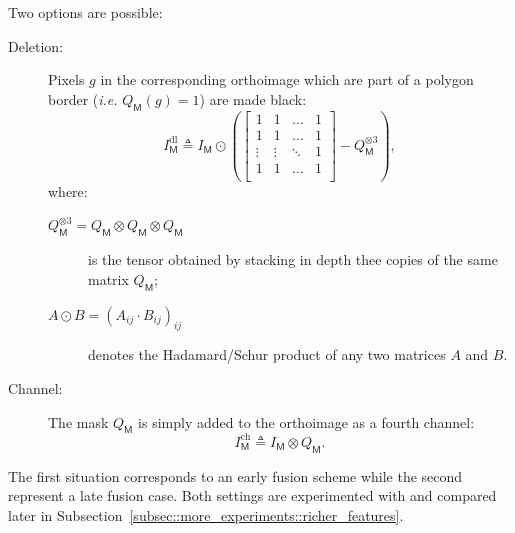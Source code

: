             Two options are possible:
            \begin{description}
                \item[Deletion:] Pixels \(g\) in the corresponding orthoimage which are part of a polygon border (\textit{i.e.} \(Q_{\mathsf{M}}(g) = 1\)) are made black:
                        \begin{equation}
                            \label{eq::deletion_orthoimage}
                            I^{\text{dl}}_{\mathsf{M}} \triangleq I_{\mathsf{M}} \odot \left(\begin{bmatrix}
                                1 & 1 & \dots & 1\\
                                1 & 1 & \dots & 1\\
                                \vdots & \vdots & \ddots & 1\\
                                1 & 1 & \dots & 1\\
                            \end{bmatrix} - Q_{\mathsf{M}}^{\otimes 3}\right),
                        \end{equation}
                        where:
                        \begin{description}
                            \item[\(Q_{\mathsf{M}}^{\otimes 3} = Q_{\mathsf{M}} \otimes Q_{\mathsf{M}} \otimes Q_{\mathsf{M}}\)] is the tensor obtained by stacking in depth thee copies of the same matrix \(Q_{\mathsf{M}}\);
                            \item[\(A \odot B  = \left(A_{ij} \cdot B_{ij} \right)_{ij}\)] denotes the Hadamard/Schur product of any two matrices \(A\) and \(B\).
                        \end{description}
                \item[Channel:] The mask \(Q_{\mathsf{M}}\) is simply added to the orthoimage as a fourth channel:
                        \begin{equation}
                            \label{eq::channel_orthoimage}
                            I^{\text{ch}}_{\mathsf{M}} \triangleq I_{\mathsf{M}} \otimes Q_{\mathsf{M}}.
                        \end{equation}
            \end{description}
            The first situation corresponds to an early fusion scheme while the second represent a late fusion case.
            Both settings are experimented with and compared later in Subsection~\ref{subsec::more_experiments::richer_features}.\\

